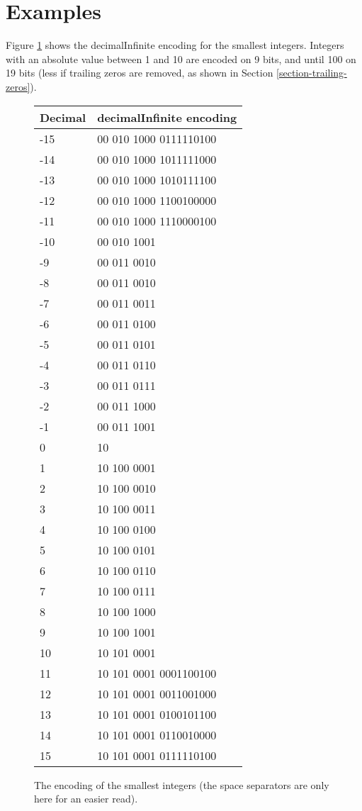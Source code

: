 \documentclass{acm_proc_article-sp}
\begin{document}
\section{Examples}
\label{section-examples}

Figure \ref{figure-first-integers} shows the decimalInfinite encoding for the smallest integers. Integers with an absolute value between 1 and 10 are encoded on 9 bits, and until 100 on 19 bits (less if trailing zeros are removed, as shown in Section \ref{section-trailing-zeros}).

\begin{figure}[h]
\caption{The encoding of the smallest integers (the space separators are only here for an easier read).}
\label{figure-first-integers}
\center
\begin{tabular}{|l|l|}
\hline
Decimal & decimalInfinite encoding \\
\hline
-15 & 00 010 1000 0111110100\\
\hline
-14 & 00 010 1000 1011111000\\
\hline
-13 & 00 010 1000 1010111100\\
\hline
-12 & 00 010 1000 1100100000\\
\hline
-11 & 00 010 1000 1110000100\\
\hline
-10 & 00 010 1001\\
\hline
-9 & 00 011 0010\\
\hline
-8 & 00 011 0010\\
\hline
-7 & 00 011 0011\\
\hline
-6 & 00 011 0100\\
\hline
-5 & 00 011 0101\\
\hline
-4 & 00 011 0110\\
\hline
-3 & 00 011 0111\\
\hline
-2 & 00 011 1000\\
\hline
-1 & 00 011 1001\\
\hline
0 & 10 \\
\hline
1 & 10 100 0001\\
\hline
2 & 10 100 0010\\
\hline
3 & 10 100 0011\\
\hline
4 & 10 100 0100\\
\hline
5 & 10 100 0101\\
\hline
6 & 10 100 0110\\
\hline
7 & 10 100 0111\\
\hline
8 & 10 100 1000\\
\hline
9 & 10 100 1001\\
\hline
10 & 10 101 0001\\
\hline
11 & 10 101 0001 0001100100\\
\hline
12 & 10 101 0001 0011001000\\
\hline
13 & 10 101 0001 0100101100\\
\hline
14 & 10 101 0001 0110010000\\
\hline
15 & 10 101 0001 0111110100\\
\hline
\hline
\end{tabular}
\end{figure}
\end{document}

